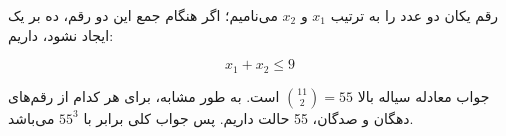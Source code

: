 \p
	رقم یکان دو عدد را به ترتیب 
	$x_1$
	و
	$x_2$
	می‌نامیم؛
	اگر هنگام جمع این دو رقم، ده بر یک ایجاد نشود، داریم:
	
	$$x_1 + x_2 \leq 9$$
	
	جواب معادله سیاله بالا
	$\binom{11}{2} = 55$
	است. به طور مشابه،
	برای هر کدام از رقم‌های دهگان و صدگان، 55 حالت داریم. پس جواب کلی برابر با
	$55^3$
	می‌باشد.